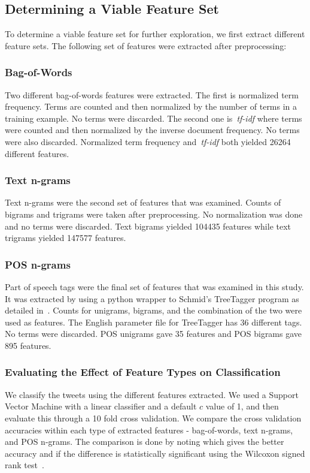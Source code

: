\documentclass[a4paper]{llncs}
\begin{document}
\subsection{Determining a Viable Feature Set}

To determine a viable feature set for further exploration, we first extract different feature sets. The following set of features were extracted after preprocessing: 


\subsubsection{Bag-of-Words}

Two different bag-of-words features were extracted. The first is normalized term frequency. Terms are counted and then normalized by the number of terms in a training example. No terms were discarded. The second one is~\textit{tf-idf} where terms were counted and then normalized by the inverse document frequency. No terms were also discarded. Normalized term frequency and~\textit{tf-idf} both yielded 26264 different features.

\subsubsection{Text n-grams}
Text n-grams were the second set of features that was examined. Counts of bigrams and trigrams were taken after preprocessing. No normalization was done and no terms were discarded. Text bigrams yielded 104435 features while text trigrams yielded 147577 features. 

\subsubsection{POS n-grams}
Part of speech tags were the final set of features that was examined in this study. It was extracted by using a python wrapper to Schmid's TreeTagger program as detailed in~\cite{schmid1994probabilistic}. Counts for unigrams, bigrams, and the combination of the two were used as features. The English parameter file for TreeTagger has 36 different tags. No terms were discarded. POS unigrams gave 35 features and POS bigrams gave 895 features.

\subsubsection{Evaluating the Effect of Feature Types on Classification}
We classify the tweets using the different features extracted. We used a Support Vector Machine with a linear classifier and a default $c$ value of 1, and then evaluate this through a 10 fold cross validation. We compare the cross validation accuracies within each type of extracted features - bag-of-words, text n-grams, and POS n-grams. The comparison is done by noting which gives the better accuracy and if the difference is statistically significant using the Wilcoxon signed rank test~\cite{wilcoxon1945individual}.
\end{document}
